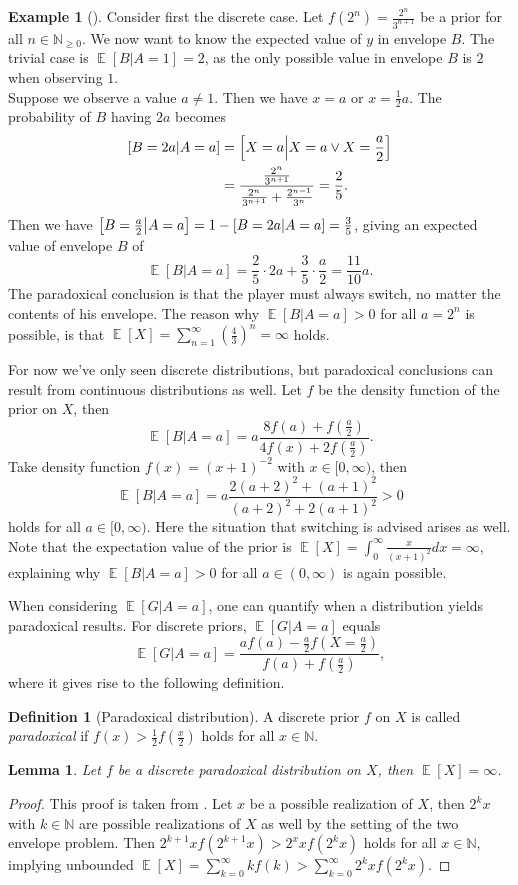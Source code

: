 \documentclass[twoside,a4paper]{article}
\theoremstyle{plain}
\newtheorem{lemma}[theorem]{Lemma}
\theoremstyle{definition}
\newtheorem{definition}[theorem]{Definition}
\newtheorem{example}[theorem]{Example}
\theoremstyle{remark}
\numberwithin{equation}{section}
\newcommand{\N}{\mathbb{N}}
\let\P\relax
\DeclareMathOperator{\P}{\mathbb{P}}
\DeclareMathOperator{\E}{\mathbb{E}}
\DeclareMathOperator{\1}{\mathbbm{1}}
\begin{document}
\begin{example}[\cite{Broome95}]
Consider first the discrete case. Let $f(2^n)=\frac{2^n}{3^{n+1}}$ be a prior for all $n\in\N_{\geq 0}$. We now want to know the expected value of $y$ in envelope $B$. The trivial case is $\E[B|A=1]=2$, as the only possible value in envelope $B$ is $2$ when observing $1$.\\
Suppose we observe a value $a\neq1$. Then we have $x=a$ or $x=\frac{1}{2}a$. The probability of $B$ having $2a$ becomes
\begin{align*}
\P[B=2a|A=a]&=\P\left[X=a\middle|X=a\lor X=\frac{a}{2}\right]\\
&=\frac{\frac{2^n}{3^{n+1}}}{\frac{2^n}{3^{n+1}}+\frac{2^{n-1}}{3^{n}}}=\frac{2}{5}.
\end{align*}
Then we have $\P\left[B=\frac{a}{2}\middle|A=a\right]=1-\P[B=2a|A=a]=\frac{3}{5}$, giving an expected value of envelope $B$ of
\[\E[B|A=a]=\frac{2}{5}\cdot2a+\frac{3}{5}\cdot\frac{a}{2}=\frac{11}{10}a.\]
The paradoxical conclusion is that the player must always switch, no matter the contents of his envelope. The reason why $\E[B|A=a]>0$ for all $a=2^n$ is possible, is that $\E[X]=\sum_{n=1}^\infty\left(\frac{4}{3}\right)^n=\infty$ holds.

For now we've only seen discrete distributions, but paradoxical conclusions can result from continuous distributions as well. Let $f$ be the density function of the prior on $X$, then
\[\E[B|A=a]=a\frac{8f(a)+f\left(\frac{a}{2}\right)}{4f(x)+2f\left(\frac{a}{2}\right)}.\]
Take density function $f(x)=(x+1)^{-2}$ with $x\in[0,\infty)$, then 
\[\E[B|A=a]=a\frac{2(a+2)^2+(a+1)^2}{(a+2)^2+2(a+1)^2}>0\]
holds for all $a\in[0,\infty)$. Here the situation that switching is advised arises as well. Note that the expectation value of the prior is $\E[X]=\int_0^\infty \frac{x}{(x+1)^2}dx=\infty$, explaining why $\E[B|A=a]>0$ for all $a\in(0,\infty)$ is again possible.
\end{example}

When considering $\E[G|A=a]$, one can quantify when a distribution yields paradoxical results. For discrete priors, $\E[G|A=a]$ equals \cite{Navara2017,Tzur18} 
\[\E[G|A=a]=\frac{af(a)-\frac{a}{2}f\left(X=\frac{a}{2}\right)}{f(a)+f\left(\frac{a}{2}\right)},\]
where it gives rise to the following definition.
\begin{definition}[Paradoxical distribution]
A discrete prior $f$ on $X$ is called \emph{paradoxical} if $f(x)>\frac{1}{2}f\left(\frac{x}{2}\right)$ holds for all $x\in\N$.
\end{definition}
\begin{lemma}
Let $f$ be a discrete paradoxical distribution on $X$, then $\E[X]=\infty$.
\end{lemma}
\begin{proof}
This proof is taken from \cite{Tzur18}. Let $x$ be a possible realization of $X$, then $2^k x$ with $k\in\N$ are possible realizations of $X$ as well by the setting of the two envelope problem. Then $2^{k+1}xf(2^{k+1} x)>2^x xf(2^kx)$ holds for all $x\in\N$, implying unbounded $\E[X]=\sum_{k=0}^\infty k f(k)>\sum_{k=0}^\infty 2^k xf(2^k x).$
\end{proof}
\end{document}

